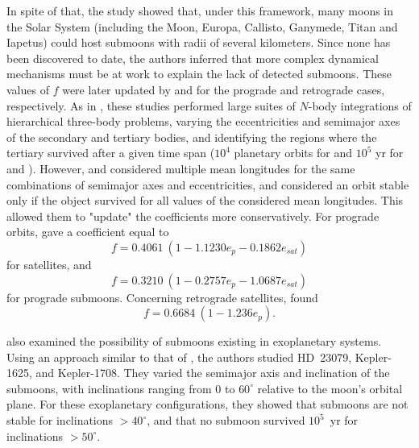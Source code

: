\documentclass{aa}
\begin{document}
In spite of that, the study showed that, under this framework, many moons in the Solar System (including the Moon, Europa, Callisto, Ganymede, Titan and Iapetus) could host submoons with radii of several kilometers. Since none has been discovered to date, the authors inferred that more complex dynamical mechanisms must be at work to explain the lack of detected submoons.
These values of $f$ were later updated by \cite{Rosario-Franco_2020} and \cite{Quarles_2021} for the prograde and retrograde cases, respectively. As in \cite{Domingos_2006}, these studies performed large suites of $N$-body integrations of hierarchical three-body problems, varying the eccentricities and semimajor axes of the secondary and tertiary bodies, and identifying the regions where the tertiary survived after a given time span ($10^4$ planetary orbits for \cite{Domingos_2006} and $10^5$ yr for \cite{Rosario-Franco_2020} and \cite{Quarles_2021}). However, \cite{Rosario-Franco_2020} and \cite{Quarles_2021} considered multiple mean longitudes for the same combinations of semimajor axes and eccentricities, and considered an orbit stable only if the object survived for all values of the considered mean longitudes. This allowed them to "update" the \cite{Domingos_2006} coefficients more conservatively. For prograde orbits, \cite{Rosario-Franco_2020} gave a coefficient equal to 
\begin{equation}
    f=0.4061 \ (1-1.1230e_p-0.1862e_{sat})
\end{equation} 
for satellites, and
\begin{equation}
    f= 0.3210 \ (1-0.2757e_p-1.0687e_{sat})
\end{equation}
for prograde submoons. Concerning retrograde satellites, \cite{Quarles_2021} found 
\begin{equation}
    f=0.6684 \ (1-1.236e_p)
.\end{equation}

\cite{Patel_2025} also examined the possibility of submoons existing in exoplanetary systems. Using an approach similar to that of \cite{Rosario-Franco_2020}, the authors studied HD~23079, Kepler-1625, and Kepler-1708. They varied the semimajor axis and inclination of the submoons, with inclinations ranging from 0 to $60^\circ$ relative to the moon's orbital plane. For these exoplanetary configurations, they showed that submoons are not stable for inclinations $>40^\circ$, and that no submoon survived $10^5$~yr for inclinations $>50^\circ$.
\end{document}
